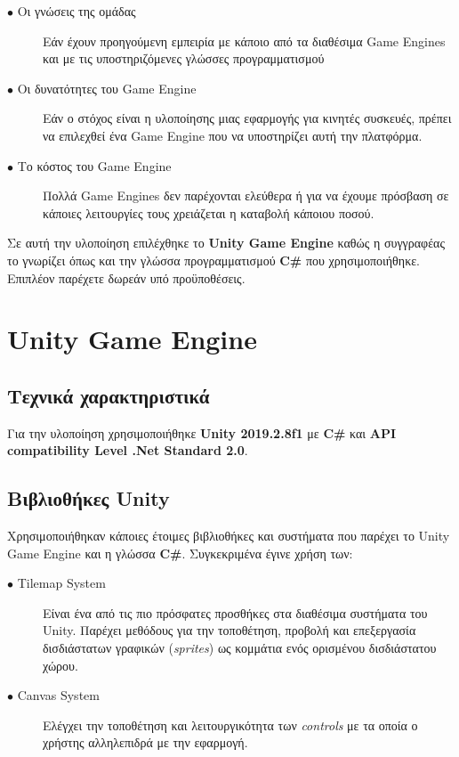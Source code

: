 \begin{description}
\item[$\bullet$ Οι γνώσεις της ομάδας] Εάν έχουν προηγούμενη εμπειρία με κάποιο από τα διαθέσιμα Game Engines και με τις υποστηριζόμενες γλώσσες προγραμματισμού
\item[$\bullet$ Οι δυνατότητες του Game Engine] Εάν ο στόχος είναι η υλοποίησης μιας εφαρμογής για κινητές συσκευές, πρέπει να επιλεχθεί ένα Game Engine που να υποστηρίζει αυτή την πλατφόρμα.
\item[$\bullet$ Το κόστος του Game Engine] Πολλά Game Engines δεν παρέχονται ελεύθερα ή για να έχουμε πρόσβαση σε κάποιες λειτουργίες τους χρειάζεται η καταβολή κάποιου ποσού.
\end{description}

\par
Σε αυτή την υλοποίηση επιλέχθηκε το \textbf{Unity Game Engine} καθώς η συγγραφέας το γνωρίζει όπως και την γλώσσα προγραμματισμού \textbf{C\#} που χρησιμοποιήθηκε. Επιπλέον παρέχετε δωρεάν υπό προϋποθέσεις.


\section{Unity Game Engine}

\subsection{Τεχνικά χαρακτηριστικά}
Για την υλοποίηση χρησιμοποιήθηκε \textbf{Unity 2019.2.8f1} με \textbf{C\#} και \textbf{API compatibility Level .Net Standard 2.0}. 

\subsection{Βιβλιοθήκες Unity}
Χρησιμοποιήθηκαν κάποιες έτοιμες βιβλιοθήκες και συστήματα που παρέχει το Unity Game Engine και η γλώσσα \textbf{C\#}. Συγκεκριμένα έγινε χρήση των:

\begin{description}
\item[$\bullet$ Tilemap System] Είναι ένα από τις πιο πρόσφατες προσθήκες στα διαθέσιμα συστήματα του Unity. Παρέχει μεθόδους για την τοποθέτηση, προβολή και επεξεργασία δισδιάστατων γραφικών (\textit{sprites}) ως κομμάτια ενός ορισμένου δισδιάστατου χώρου. \cite{unitytilemap}
\item[$\bullet$ Canvas System] Ελέγχει την τοποθέτηση και λειτουργικότητα των \textit{controls} με τα οποία ο χρήστης αλληλεπιδρά με την εφαρμογή. \cite{unitycanvas}
\end{description}


